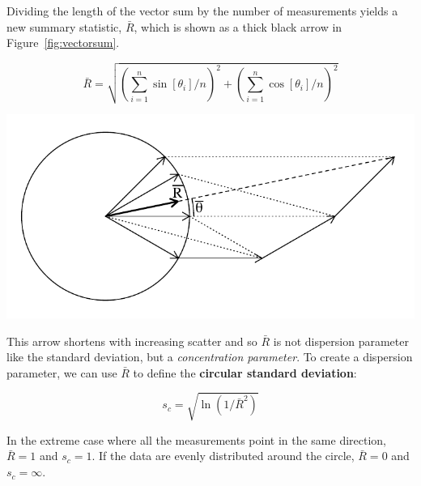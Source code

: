 Dividing the length of the vector sum by the number of measurements
yields a new summary statistic, $\bar{R}$, which is shown as a thick
black arrow in Figure~\ref{fig:vectorsum}.

\begin{equation}
  \bar{R} = \sqrt{\left(\sum_{i=1}^{n} \sin[\theta_i]/n\right)^2 +
    \left( \sum_{i=1}^{n}\cos[\theta_i]/n \right)^2}
  \label{eq:circularR}
\end{equation}

\noindent\begin{minipage}[t][][b]{.45\textwidth}
\includegraphics[width=\textwidth]{../figures/vectorsum.pdf}\\
\end{minipage}
\begin{minipage}[t][][t]{.55\textwidth}
  \label{fig:vectorsum}
\end{minipage}

This arrow shortens with increasing scatter and so $\bar{R}$ is not
dispersion parameter like the standard deviation, but a
\textit{concentration parameter}. To create a dispersion parameter, we
can use $\bar{R}$ to define the \textbf{circular standard deviation}:

\begin{equation}
  s_c = \sqrt{\ln(1/\bar{R}^2)}
  \label{eq:circularSD}
\end{equation}

In the extreme case where all the measurements point in the same
direction, $\bar{R} = 1$ and $s_c = 1$. If the data are evenly
distributed around the circle, $\bar{R} = 0$ and $s_c = \infty$.

